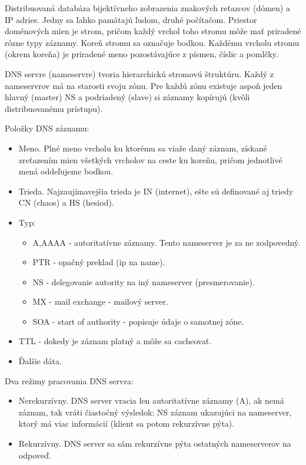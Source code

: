 \documentclass[10pt,a4paper]{article}
\begin{document}
Distribuovaná databáza bijektívneho zobrazenia znakových reťazcov (dómen) a IP adries. Jedny sa ľahko pamätajú ľudom, druhé počítačom. Priestor doménových mien je strom, pričom každý vrchol toho stromu môže mať priradené rôzne typy záznamy. Koreň stromu sa označuje bodkou. Každému vrcholu stromu (okrem koreňa) je priradené meno pozostávajúce z písmen, číslic a pomlčky.

DNS servre (nameservre) tvoria hierarchickú stromovú štruktúru. Každý z nameservrov má na starosti svoju zónu. Pre každú zónu existuje aspoň jeden hlavný (master) NS a podriadený (slave) si záznamy kopírujú (kvôli distribuovanému prístupu). 

Položky DNS záznamu: 
\begin{itemize}
\item Meno. Plné meno vrcholu ku ktorému sa viaže daný záznam, získané zreťazením mien všetkých vrcholov na ceste ku koreňu, pričom jednotlivé mená oddeľujeme bodkou.
\item Trieda. Najzaujímavejšia trieda je IN (internet), ešte sú definované aj triedy CN (chaos) a HS (hesiod). 
\item Typ:
\begin{itemize}
\item A,AAAA - autoritatívne záznamy. Tento nameserver je za ne zodpovedný. 
\item PTR - opačný preklad (ip na name). 
\item NS - delegovanie autority na iný nameserver (presmerovanie). 
\item MX - mail exchange - mailový server. 
\item SOA - start of authority - popisuje údaje o samotnej zóne. 
\end{itemize}
\item TTL - dokedy je záznam platný a môže sa cacheovať. 
\item Ďalšie dáta. 
\end{itemize}

Dva režimy pracovania DNS servra: 
\begin{itemize}
\item Nerekurzívny. DNS server vracia len autoritatívne záznamy (A), ak nemá záznam, tak vráti čiastočný výsledok: NS záznam ukazujúci na nameserver, ktorý má viac informácií (klient sa potom rekurzívne pýta). 
\item Rekurzívny. DNS server sa sám rekurzívne pýta ostatných nameserverov na odpoveď.
\end{itemize}
\end{document}

